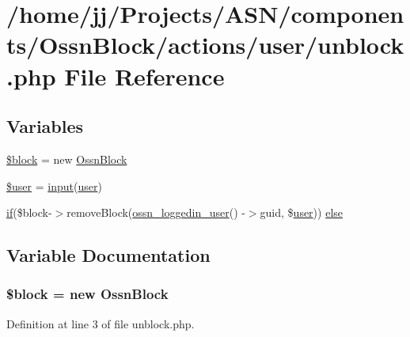 \hypertarget{unblock_8php}{}\section{/home/jj/\+Projects/\+A\+S\+N/components/\+Ossn\+Block/actions/user/unblock.php File Reference}
\label{unblock_8php}
\subsection*{Variables}
\begin{DoxyCompactItemize}
\item 
\hyperlink{unblock_8php_a7f8f86b37cd48a37bf0df573d8512d11}{\$block} = new \hyperlink{class_ossn_block}{Ossn\+Block}
\item 
\hyperlink{unblock_8php_a598ca4e71b15a1313ec95f0df1027ca5}{\$user} = \hyperlink{ossn_8lib_8input_8php_a64ebee98b041c4f75f71ed3cd73cc8ed}{input}(\textquotesingle{}\hyperlink{ossn_8config_8db_8example_8php_a802544b7ba9f79bbf24ef67773d53bed}{user}\textquotesingle{})
\item 
\hyperlink{jquery_8tokeninput_8js_ad8dd46a3cbc004569e34401e9e71771a}{if}(\$block-\/$>$remove\+Block(\hyperlink{ossn_8lib_8users_8php_aa3c8068d0e6638b414d6a2f6c62565b8}{ossn\+\_\+loggedin\+\_\+user}() -\/$>$guid, \$\hyperlink{ossn_8config_8db_8example_8php_a802544b7ba9f79bbf24ef67773d53bed}{user})) \hyperlink{unblock_8php_afdb417072b9e524a61d8a3af1bd9ff14}{else}
\end{DoxyCompactItemize}


\subsection{Variable Documentation}
\subsubsection[{\texorpdfstring{\$block}{$block}}]{\setlength{\rightskip}{0pt plus 5cm}\$block = new {\bf Ossn\+Block}}\hypertarget{unblock_8php_a7f8f86b37cd48a37bf0df573d8512d11}{}\label{unblock_8php_a7f8f86b37cd48a37bf0df573d8512d11}


Definition at line 3 of file unblock.\+php.

